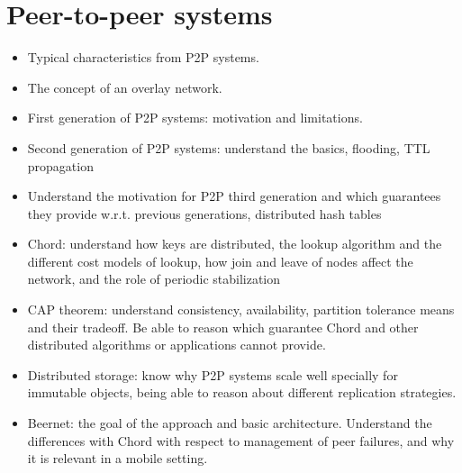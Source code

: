 \documentclass[a4paper]{report}
\begin{document}
\chapter{Peer-to-peer systems}
\begin{itemize}
\item Typical characteristics from P2P systems.
\item The concept of an overlay network.
\item First generation of P2P systems: motivation and limitations.
\item Second generation of P2P systems: understand the basics, flooding, TTL propagation
\item Understand the motivation for P2P third generation and which guarantees they
provide w.r.t. previous generations, distributed hash tables
\item Chord: understand how keys are distributed, the lookup algorithm and the different
cost models of lookup, how join and leave of nodes affect the network, and the role of
periodic stabilization
\item CAP theorem: understand consistency, availability, partition tolerance means and their
tradeoff. Be able to reason which guarantee Chord and other distributed algorithms or
applications cannot provide.
\item Distributed storage: know why P2P systems scale well specially for immutable objects,
being able to reason about different replication strategies.
\item Beernet: the goal of the approach and basic architecture. Understand the differences
with Chord with respect to management of peer failures, and why it is relevant in a
mobile setting.
\end{itemize}
\end{document}
